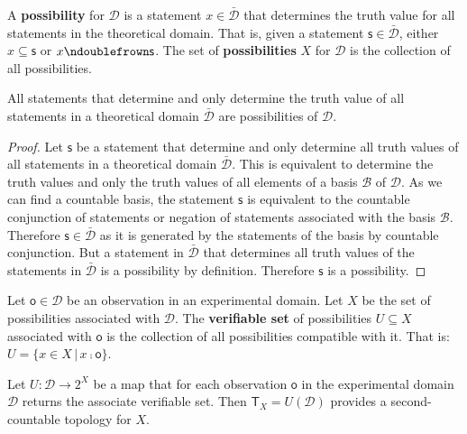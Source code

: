 \documentclass[11pt,letterpaper,fleqn]{memoir} %
\begin{document}
\begin{mathSection}
\begin{defn}
	A \textbf{possibility} for $\mathcal{D}$ is a statement $x \in \bar{\mathcal{D}}$ that determines the truth value for all statements in the theoretical domain. That is, given a statement $\mathsf{s} \in \bar{\mathcal{D}}$, either $x \subseteq \mathsf{s}$ or $x \ncomp \mathsf{s}$. The set of \textbf{possibilities} $X$ for $\mathcal{D}$ is the collection of all possibilities.
\end{defn}

\begin{prop}
	All statements that determine and only determine the truth value of all statements in a theoretical domain $\bar{\mathcal{D}}$ are possibilities of $\mathcal{D}$.
\end{prop}

\begin{proof}
	Let $\mathsf{s}$ be a statement that determine and only determine all truth values of all statements in a theoretical domain $\bar{\mathcal{D}}$. This is equivalent to determine the truth values and only the truth values of all elements of a basis $\mathcal{B}$ of $\mathcal{D}$. As we can find a countable basis, the statement $\mathsf{s}$ is equivalent to the countable conjunction of statements or negation of statements associated with the basis $\mathcal{B}$. Therefore $\mathsf{s} \in \bar{\mathcal{D}}$ as it is generated by the statements of the basis by countable conjunction. But a statement in $\bar{\mathcal{D}}$ that determines all truth values of the statements in $\bar{\mathcal{D}}$ is a possibility by definition. Therefore $\mathsf{s}$ is a possibility.
\end{proof}
	
\begin{defn}
	Let $\mathsf{o} \in \mathcal{D}$ be an observation in an experimental domain. Let $X$ be the set of possibilities associated with $\mathcal{D}$. The  \textbf{verifiable set} of possibilities $U \subseteq X$ associated with $\mathsf{o}$ is the collection of all possibilities compatible with it. That is: $U=\{ x \in X \, | \, x \comp \mathsf{o}\}$.
\end{defn}

\begin{prop}
	Let $U : \mathcal{D} \rightarrow 2^X$ be a map that for each observation $\mathsf{o}$ in the experimental domain $\mathcal{D}$ returns the associate verifiable set. Then $\mathsf{T}_X=U(\mathcal{D})$ provides a second-countable topology for $X$.
\end{prop}


\end{mathSection}
\end{document}
